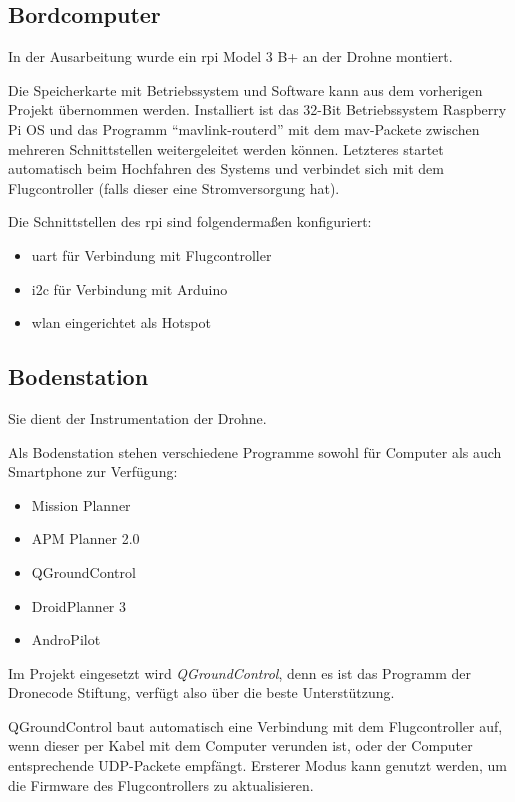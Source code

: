 \subsection{Bordcomputer}
In der Ausarbeitung \cite{markusreinErweiterungBestehenderDrohnen2023} wurde ein \acrlong{rpi} Model 3 B+ an der Drohne montiert.

Die Speicherkarte mit Betriebssystem und Software kann aus dem vorherigen Projekt übernommen werden. Installiert ist das 32-Bit Betriebssystem Raspberry Pi OS und das Programm \enquote{mavlink-routerd} mit dem \acrshort{mav}-Packete zwischen mehreren Schnittstellen weitergeleitet werden können. Letzteres startet automatisch beim Hochfahren des Systems und verbindet sich mit dem Flugcontroller (falls dieser eine Stromversorgung hat).

Die Schnittstellen des \gls{rpi} sind folgendermaßen konfiguriert:
\begin{itemize}
    \item \gls{uart} für Verbindung mit Flugcontroller
    \item \gls{i2c} für Verbindung mit Arduino
    \item \gls{wlan} eingerichtet als Hotspot
\end{itemize}

\subsection{Bodenstation}
Sie dient der Instrumentation der Drohne. 

Als Bodenstation stehen verschiedene Programme sowohl für Computer als auch Smartphone zur Verfügung\cite{ardupilotdevteamChoosingGroundStation}:
\begin{itemize}
    \item Mission Planner
    \item APM Planner 2.0
    \item QGroundControl
    \item DroidPlanner 3
    \item AndroPilot
\end{itemize}
Im Projekt eingesetzt wird \textit{QGroundControl}, denn es ist das Programm der Dronecode Stiftung, verfügt also über die beste Unterstützung.\newline

QGroundControl baut automatisch eine Verbindung mit dem Flugcontroller auf, wenn dieser per Kabel mit dem Computer verunden ist, oder der Computer entsprechende UDP-Packete empfängt. Ersterer Modus kann genutzt werden, um die Firmware des Flugcontrollers zu aktualisieren.

